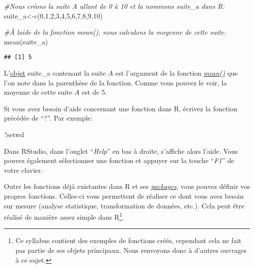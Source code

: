 \documentclass[
]{book}
\newenvironment{Shaded}{\begin{snugshade}}{\end{snugshade}}
\newcommand{\CommentTok}[1]{\textcolor[rgb]{0.56,0.35,0.01}{\textit{#1}}}
\newcommand{\DecValTok}[1]{\textcolor[rgb]{0.00,0.00,0.81}{#1}}
\newcommand{\FunctionTok}[1]{\textcolor[rgb]{0.00,0.00,0.00}{#1}}
\newcommand{\NormalTok}[1]{#1}
\newcommand{\OtherTok}[1]{\textcolor[rgb]{0.56,0.35,0.01}{#1}}
\begin{document}
\begin{Shaded}
\begin{Highlighting}[]
\CommentTok{\#Nous créons la suite A allant de 0 à 10 et la nommons suite\_a dans R:}
\NormalTok{suite\_a}\OtherTok{\textless{}{-}}\FunctionTok{c}\NormalTok{(}\DecValTok{0}\NormalTok{,}\DecValTok{1}\NormalTok{,}\DecValTok{2}\NormalTok{,}\DecValTok{3}\NormalTok{,}\DecValTok{4}\NormalTok{,}\DecValTok{5}\NormalTok{,}\DecValTok{6}\NormalTok{,}\DecValTok{7}\NormalTok{,}\DecValTok{8}\NormalTok{,}\DecValTok{9}\NormalTok{,}\DecValTok{10}\NormalTok{)}

\CommentTok{\#À l\textquotesingle{}aide de la fonction mean(), nous calculons la moyenne de cette suite:}
\FunctionTok{mean}\NormalTok{(suite\_a)}
\end{Highlighting}
\end{Shaded}

\begin{verbatim}
## [1] 5
\end{verbatim}

L'\protect\hyperlink{objets_envir}{objet} suite\_a contenant la suite \(A\) est l'argument de la fonction \href{https://www.rdocumentation.org/packages/base/versions/3.6.2/topics/mean}{\emph{mean()}} que l'on note dans la parenthèse de la fonction. Comme vous pouvez le voir, la moyenne de cette suite \(A\) est de 5.

Si vous avez besoin d'aide concernant une fonction dans R, écrivez la fonction précédée de ``?''. Par exemple:

\begin{Shaded}
\begin{Highlighting}[]
\NormalTok{?setwd}
\end{Highlighting}
\end{Shaded}

Dans RStudio, dans l'onglet ``\emph{Help}'' en bas à droite, s'affiche alors l'aide. Vous pouvez également sélectionner une fonction et appuyer sur la touche ``\emph{F1}'' de votre clavier.

Outre les fonctions déjà existantes dans R et ses \protect\hyperlink{packages}{\emph{packages}}, vous pouvez définir vos propres fonctions. Celles-ci vous permettent de réaliser ce dont vous avez besoin sur mesure (analyse statistique, transformation de données, etc.). Cela peut être réalisé de manière assez simple dans R\footnote{Ce syllabus contient des exemples de fonctions créés, cependant cela ne fait pas partie de ses objets principaux. Nous renvoyons donc à d'autres ouvrages à ce sujet.}.
\end{document}
